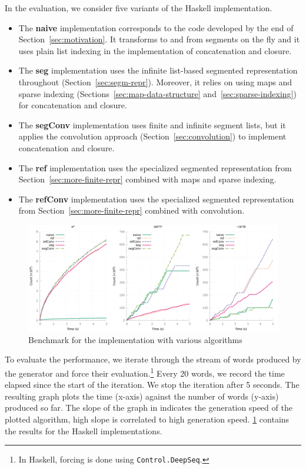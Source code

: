 In the evaluation, we consider five variants of the Haskell implementation.
\begin{itemize}
\item The \textbf{naive} implementation corresponds to the code developed by
  the end of Section~\ref{sec:motivation}. It transforms to and from
  segments on the fly and it uses plain list indexing in the
  implementation of concatenation and closure.
\item The \textbf{seg} implementation uses the infinite list-based segmented
  representation throughout (Section~\ref{sec:segm-repr}). Moreover,
  it relies on using maps and sparse indexing
  (Sections~\ref{sec:map-data-structure} and~\ref{sec:sparse-indexing})
  for concatenation and closure.
\item The \textbf{segConv} implementation uses finite and infinite
  segment lists, but it applies the convolution approach
  (Section~\ref{sec:convolution}) to implement concatenation and
  closure.
\item The \textbf{ref} implementation uses the specialized segmented
  representation from Section~\ref{sec:more-finite-repr} combined with
  maps and sparse indexing.
\item The \textbf{refConv} implementation uses the specialized
  segmented representation from Section~\ref{sec:more-finite-repr}
  combined with convolution.
\end{itemize}

\begin{figure}[btp]
  \centering
  \includegraphics[width=\textwidth]{measure/haskell_all.png}
  \caption{Benchmark for the \haskell implementation with various algorithms}
  \label{bench:haskell:all}
\end{figure}
To evaluate the performance, we iterate through the stream of words
produced by the generator and force their evaluation.\footnote{In
  Haskell, forcing is done using \lstinline{Control.DeepSeq}.} Every
20 words, we record the time elapsed since the start of the iteration. We
stop the iteration after 5 seconds. The resulting graph plots the time (x-axis) against the number of words (y-axis) produced so far. The slope of the graph in indicates the generation speed of the plotted algorithm, high slope is correlated to high generation speed.  \cref{bench:haskell:all} contains the results for the Haskell implementations.

